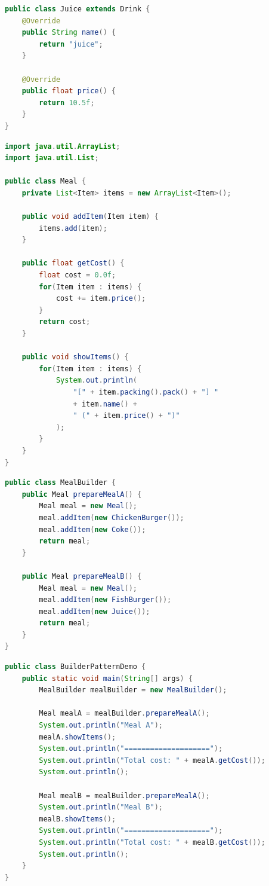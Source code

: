 \begin{lstlisting}[language=Java, title=Juice.java]
public class Juice extends Drink {
    @Override
    public String name() {
        return "juice";
    }

    @Override
    public float price() {
        return 10.5f;
    }
}
\end{lstlisting}

\begin{lstlisting}[language=Java, title=Meal.java]
import java.util.ArrayList;
import java.util.List;

public class Meal {
    private List<Item> items = new ArrayList<Item>();

    public void addItem(Item item) {
        items.add(item);
    }

    public float getCost() {
        float cost = 0.0f;
        for(Item item : items) {
            cost += item.price();
        }
        return cost;
    }

    public void showItems() {
        for(Item item : items) {
            System.out.println(
                "[" + item.packing().pack() + "] "
                + item.name() +
                " (" + item.price() + ")"
            );
        }
    }
}
\end{lstlisting}

\begin{lstlisting}[language=Java, title=MealBuilder.java]
public class MealBuilder {
    public Meal prepareMealA() {
        Meal meal = new Meal();
        meal.addItem(new ChickenBurger());
        meal.addItem(new Coke());
        return meal;
    }

    public Meal prepareMealB() {
        Meal meal = new Meal();
        meal.addItem(new FishBurger());
        meal.addItem(new Juice());
        return meal;
    }
}
\end{lstlisting}

\begin{lstlisting}[language=Java, title=BuilderPatternDemo.java]
public class BuilderPatternDemo {
    public static void main(String[] args) {
        MealBuilder mealBuilder = new MealBuilder();

        Meal mealA = mealBuilder.prepareMealA();
        System.out.println("Meal A");
        mealA.showItems();
        System.out.println("====================");
        System.out.println("Total cost: " + mealA.getCost());
        System.out.println();

        Meal mealB = mealBuilder.prepareMealA();
        System.out.println("Meal B");
        mealB.showItems();
        System.out.println("====================");
        System.out.println("Total cost: " + mealB.getCost());
        System.out.println();
    }
}    
\end{lstlisting}

